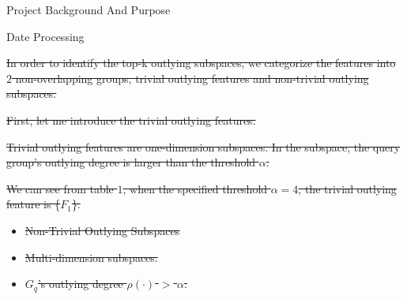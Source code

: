 \documentclass[
 size=14pt,
 paper=smartboard,  %
 mode=present, 		%
 display=slides, 	%
 style=tuliplab,  	%
 pauseslide,
 fleqn,leqno]{powerdot}
\providecommand{\DIFdeltex}[1]{{\protect\color{red}\sout{#1}}}                      %
\providecommand{\DIFdel}[1]{\texorpdfstring{\DIFdeltex{#1}}{}} %
\begin{document}
\begin{slide}
\begin{slide}{Project Background And Purpose}
\begin{slide}{Date Processing}
\begin{note}
\DIFdel{In order to identify the top-k outlying subspaces,
we categorize the features into $2$ non-overlapping groups,
trivial outlying features and non-trivial outlying subspaces.
}%

\DIFdel{First, let me introduce the trivial outlying features.
}%

\DIFdel{Trivial outlying features are one-dimension subspaces.
In the subspace,
the query group's outlying degree is larger than the threshold $\alpha$.
}%

\DIFdel{We can see from table $1$,
when the specified threshold $\alpha = 4$,
the trivial outlying feature is \{$F_1$\}.
}%


\begin{itemize}%
\item%
\DIFdel{Non-Trivial Outlying Subspaces
}%
\item%
\DIFdel{Multi-dimension subspaces.
}%

\item%
\DIFdel{${G_q}$'s outlying degree $\rho(\cdot)$ $>$ $\alpha$.
}
\end{itemize}%


\end{note}
\end{slide}
\end{slide}
\end{slide}
\end{document}
